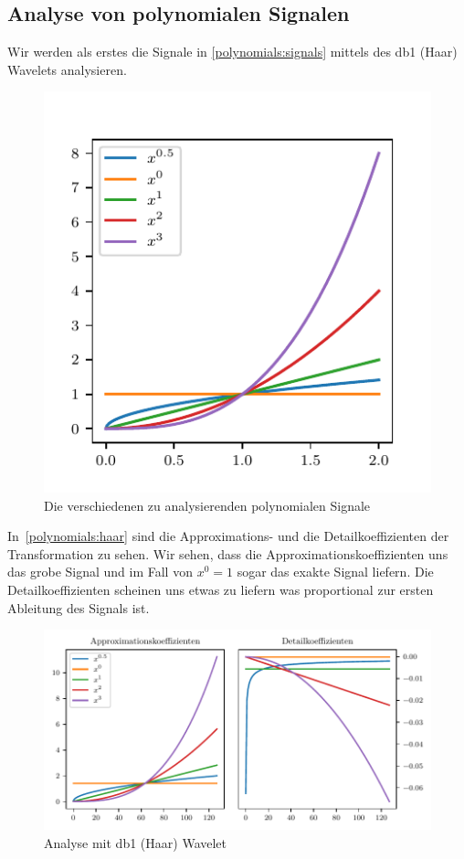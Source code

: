 \begin{refsection}
\section{Analyse von polynomialen Signalen}

Wir werden als erstes die Signale in \autoref{polynomials:signals} mittels des db1
(Haar) Wavelets analysieren.

\begin{figure}
    \centering
    \includegraphics{papers/polynomials/images/polynomials_signals.pdf}
    \caption{Die verschiedenen zu analysierenden polynomialen Signale\label{polynomials:signals}}
\end{figure}

In~\autoref{polynomials:haar} sind die Approximations- und die Detailkoeffizienten
der Transformation zu sehen. Wir sehen, dass die Approximationskoeffizienten
uns das grobe Signal und im Fall von $x^0 = 1$ sogar das exakte Signal liefern. Die
Detailkoeffizienten scheinen uns etwas zu liefern was proportional zur ersten
Ableitung des Signals ist.

\begin{figure}
    \centering
    \includegraphics{papers/polynomials/images/polynomials_signals_db1.pdf}
    \caption{Analyse mit db1 (Haar) Wavelet\label{polynomials:haar}}
\end{figure}


\end{refsection}
